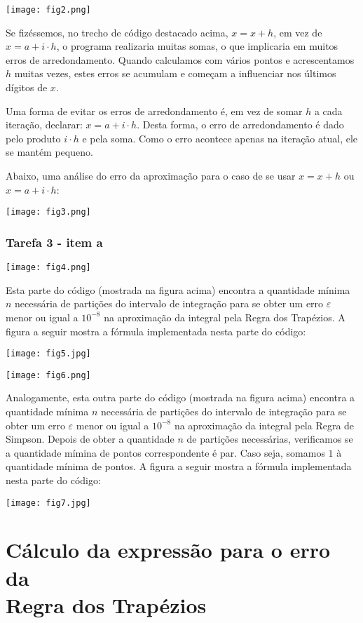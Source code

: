 \documentclass[12pt, a4paper]{article}
\begin{document}
	\vspace{1cm}
	
	\texttt{[image: fig2.png]}
	
	Se fizéssemos, no trecho de código destacado acima, $x = x + h$, em vez de $x = a + i \cdot h$, o programa realizaria muitas somas, o que
	 implicaria em muitos erros de arredondamento. Quando calculamos com vários pontos e acrescentamos $h$ muitas vezes, estes erros se acumulam e começam a influenciar nos últimos dígitos de $x$. 
	 
	 Uma forma de evitar os erros de arredondamento é, em vez de somar $h$ a cada iteração, declarar: $x = a + i \cdot h$. Desta forma, o erro de arredondamento é dado pelo produto $i\cdot h$ e pela soma. Como o erro acontece apenas na iteração atual, ele se mantém pequeno.
	
	Abaixo, uma análise do erro da aproximação para o caso de se usar $x = x + h$ ou $x = a + i\cdot h$:
	
	\texttt{[image: fig3.png]}
	
	\subsubsection*{Tarefa 3 - item a}
	
	\texttt{[image: fig4.png]}
	
	Esta parte do código (mostrada na figura acima) encontra a quantidade mínima $n$ necessária de partições do intervalo de integração para se obter um erro $\varepsilon$ menor ou igual a $10^{-8}$ na aproximação da integral pela Regra dos Trapézios. A figura a seguir mostra a fórmula implementada nesta parte do código:
	
	\texttt{[image: fig5.jpg]}
	
	\texttt{[image: fig6.png]}
	
	Analogamente, esta outra parte do código (mostrada na figura acima) encontra a quantidade mínima $n$ necessária de partições do intervalo de integração para se obter um erro $\varepsilon$ menor ou igual a $10^{-8}$ na aproximação da integral pela Regra de Simpson. Depois de obter a quantidade $n$ de partições necessárias, verificamos se a quantidade mímina de pontos correspondente é par. Caso seja, somamos $1$ à quantidade mínima de pontos. A figura a seguir mostra a fórmula implementada nesta parte do código:
	
	\texttt{[image: fig7.jpg]}
	
	\section*{Cálculo da expressão para o erro da \\Regra dos Trapézios}
	
\end{document}
